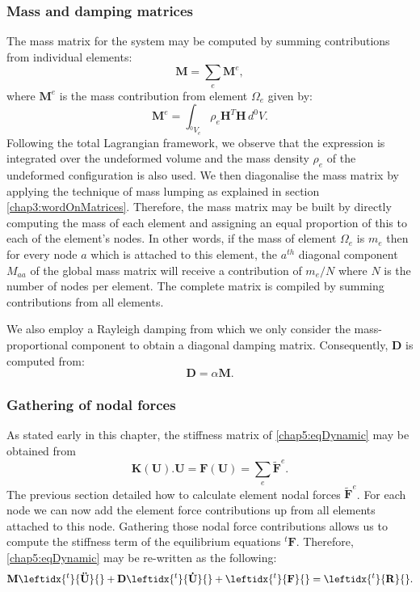 		\subsubsection*{Mass and damping matrices}					
The mass matrix for the system may be computed by summing contributions from individual elements:
\begin{equation}
\mathbf{M} = \sum_e \mathbf{M}^e,
\end{equation}		
where $ \mathbf{M}^e $ is the mass contribution from element $ \Omega_e $ given by:
\begin{equation}
\mathbf{M}^e = \int_{^0 V_e} \rho_e \mathbf{H}^T \mathbf{H} \, d^0 V.
\end{equation}
Following the total Lagrangian framework, we observe that the expression is integrated over the undeformed volume and the mass density $ \rho_e $ of the undeformed configuration is also used. We then diagonalise the mass matrix by applying the technique of mass lumping as explained in section \ref{chap3:wordOnMatrices}. Therefore, the mass matrix may be built by directly computing the mass of each element and assigning an equal proportion of this to each of the element's nodes. In other words, if the mass of element $ \Omega_e $ is $ m_e $ then for every node $ a $ which is attached to this element, the $ a^{th} $ diagonal component $ M_{aa} $ of the global mass matrix will receive a contribution of $ m_e/N $ where $ N $ is the number of nodes per element. The complete matrix is compiled by summing contributions from all elements. 

We also employ a Rayleigh damping from which we only consider the mass-proportional component to obtain a diagonal damping matrix. Consequently, $ \mathbf{D} $ is computed from:
\begin{equation}
\mathbf{D} = \alpha \mathbf{M}.
\end{equation}


		\subsubsection*{Gathering of nodal forces}
As stated early in this chapter, the stiffness matrix of \eqref{chap5:eqDynamic} may be obtained from
\begin{equation}
\mathbf{K(\mathbf{U}).\mathbf{U}} = \mathbf{F}(\mathbf{U}) = \sum_e \mathbf{\tilde{F}}^e.
\end{equation}
The previous section detailed how to calculate element nodal forces $ \mathbf{\tilde{F}}^e $. For each node we can now add the element force contributions up from all elements attached to this node. Gathering those nodal force contributions allows us to compute the stiffness term of the equilibrium equations $ ^t\mathbf{F} $. Therefore, \eqref{chap5:eqDynamic} may be re-written as the following:
\begin{equation}
\label{chap5:eqDynamic2}
\mathbf{M} \leftidx{^t}{ \mathbf{\mathbf{\ddot U}} }{} + \mathbf{D} \leftidx{^t}{ \mathbf{\mathbf{\dot U}} }{} + \leftidx{^t}{\mathbf{F}}{} = \leftidx{^t}{\mathbf{R}}{}.
\end{equation}
		
